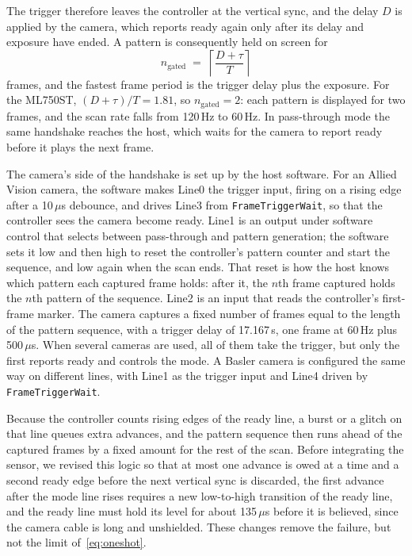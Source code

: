 \documentclass[10pt,journal,compsoc]{IEEEtran}
\newcommand{\SI}[2]{#1\,#2}
\newcommand{\micro}{\ensuremath{\mu}}
\newcommand{\second}{s}\newcommand{\hertz}{Hz}\newcommand{\metre}{m}
\begin{document}
The trigger therefore leaves the controller at the vertical sync, and the delay $D$ is applied by
the camera, which reports ready again only after its delay and exposure have ended. A pattern is
consequently held on screen for
\begin{equation}
n_{\text{gated}} \;=\; \left\lceil \frac{D+\tau}{T} \right\rceil
\label{eq:oneshot}
\end{equation}
frames, and the fastest frame period is the trigger delay plus the exposure. For the ML750ST,
$(D+\tau)/T=1.81$, so $n_{\text{gated}}=2$: each pattern is displayed for two frames, and the
scan rate falls from \SI{120}{\hertz} to \SI{60}{\hertz}. In pass-through mode the same
handshake reaches the host, which waits for the camera to report ready before it plays the next
frame.

The camera's side of the handshake is set up by the host software. For an Allied Vision camera,
the software makes Line0 the trigger input, firing on a rising edge after a \SI{10}{\micro\second}
debounce, and drives Line3 from \texttt{FrameTriggerWait}, so that the controller sees the camera
become ready. Line1 is an output under software control that selects between pass-through and
pattern generation; the software sets it low and then high to reset the controller's pattern
counter and start the sequence, and low again when the scan ends. That reset is how the host
knows which pattern each captured frame holds: after it, the $n$th frame captured holds the $n$th
pattern of the sequence. Line2 is an input that reads
the controller's first-frame marker. The camera captures a fixed number of frames equal to the
length of the pattern sequence, with a trigger delay of \SI{17.167}{\milli\second}, one frame at
\SI{60}{\hertz} plus \SI{500}{\micro\second}. When several cameras are used, all of them take
the trigger, but only the first reports ready and controls the mode. A Basler camera is
configured the same way on different lines, with Line1 as the trigger input and Line4 driven by
\texttt{FrameTriggerWait}.

Because the controller counts rising edges of the ready line, a burst or a glitch on that line
queues extra advances, and the pattern sequence then runs ahead of the captured frames by a
fixed amount for the rest of the scan. Before integrating the sensor, we revised this logic so
that at most one advance is owed at a time and a second ready edge before the next vertical sync
is discarded, the first advance after the mode line rises requires a new low-to-high transition
of the ready line, and the ready line must hold its level for about \SI{135}{\micro\second}
before it is believed, since the camera cable is long and unshielded. These changes remove the
failure, but not the limit of~\eqref{eq:oneshot}.
\end{document}
